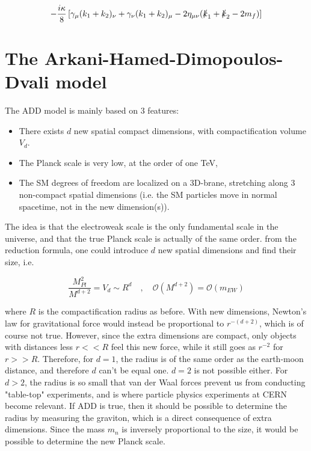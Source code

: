 \documentclass[11pt,a4paper]{article}
\begin{document}
\begin{equation}
	-\frac{i\kappa}{8}\left[\gamma_\mu(k_1 + k_2)_ \nu + \gamma_\nu(k_1+k_2)_\mu - 2\eta_{\mu\nu}(\slashed k_1 + \slashed k_2 - 2m_f)\right]
	\label{eq:Gcoupling}
\end{equation}

\section{The Arkani-Hamed-Dimopoulos-Dvali model}
The ADD model is mainly based on 3 features:

\begin{itemize}
	\item There exists $d$ new spatial compact dimensions, with compactification volume $V_d$.
	\item The Planck scale is very low, at the order of one TeV,
	\item The SM degrees of freedom are localized on a 3D-brane, stretching along 3 non-compact spatial dimensions (i.e. the SM particles move in normal spacetime, not in the new dimension(s)).
\end{itemize}

The idea is that the electroweak scale is the only fundamental scale in the universe, and that the true Planck scale is actually of the same order. from the reduction formula, one could introduce $d$ new spatial dimensions and find their size, i.e.

\begin{equation}
	\frac{M_{Pl}^2}{M^{d+2}} = V_d \sim R^d	\quad,\quad \mathcal{O}(M^{d+2}) = \mathcal{O}(m_{EW})
\end{equation}

where $R$ is the compactification radius as before. With new dimensions, Newton's law for gravitational force would instead be proportional to $r^{-(d+2)}$, which is of course not true. However, since the extra dimensions are compact, only objects with distances less $r<<R$ feel this new force, while it still goes as $r^{-2}$ for $r>>R$. Therefore, for $d=1$, the radius is of the same order as the earth-moon distance, and therefore $d$ can't be equal one. $d=2$ is not possible either. For $d>2$, the radius is so small that van der Waal forces prevent us from conducting "table-top" experiments, and is where particle physics experiments at CERN become relevant. If ADD is true, then it should be possible to determine the radius by measuring the graviton, which is a direct consequence of extra dimensions. Since the mass $m_n$ is inversely proportional to the size, it would be possible to determine the new Planck scale.
\end{document}
